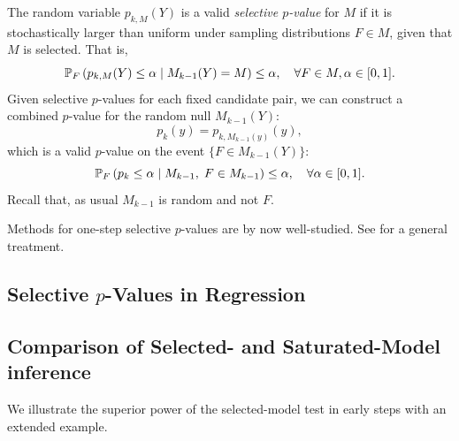 \documentclass{article}
\begin{document}
The random variable  $p_{k,M}(Y)$ is a valid {\em selective $p$-value} for $M$ if it is stochastically larger than uniform under sampling distributions $F\in M$, given that $M$ is selected. That is,
\[
\P_F\left(p_{k,M}(Y) \leq \alpha \mid M_{k-1}(Y) = M\right) 
\leq \alpha, \quad \forall F\in M, \alpha \in [0,1].
\]
Given selective $p$-values for each fixed candidate pair, we can construct a combined $p$-value for the random null $M_{k-1}(Y)$: 
\[
p_k(y) = p_{k, M_{k-1}(y)}(y),
\]
which is a valid $p$-value on the event $\{F \in M_{k-1}(Y)\}$:
\[
\P_F\left(p_k \leq \alpha \mid M_{k-1}, 
  \;F\in M_{k-1}\right) \leq \alpha, \quad \forall \alpha \in [0,1].
\]
Recall that, as usual $M_{k-1}$ is random and not $F$.

Methods for one-step selective $p$-values are by now well-studied.  See \citet{fithian2014optimal} for a general treatment. 

\subsection{Selective $p$-Values in Regression}



\subsection{Comparison of Selected- and Saturated-Model inference}

We illustrate the superior power of the selected-model test in early steps with an extended example.
\end{document}
